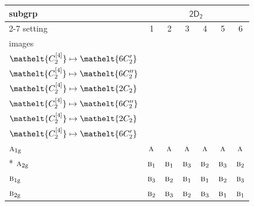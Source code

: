 \documentclass[10pt,a4paper]{article}
\numberwithin{equation}{section}
\newcommand{\eltfont}[1]{{\let\sigma\eltsigma\mathelt{#1}}}
\newcommand{\grp}[1]{\mathsf{#1}}
\newcommand{\irr}[1]{\text{\normalfont\scshape #1}}
\newcommand{\cls}[1]{\eltfont{#1}}
\newcommand{\ptag}[1]{\mathrm{#1}}
\newcommand{\genidx}[2]{#1^{[\mathrm{#2}]}}
\begin{document}
{\small\begin{longtable}{@{}lcccccc@{}}\toprule
subgrp & \multicolumn{6}{c}{\href{2D2.pdf}{$\grp{2D_{2}}$}}\\\cmidrule(lr){2-7}
setting & 1 & 2 & 3 & 4 & 5 & 6\\
images & {\scriptsize\begin{tabular}[t]{@{}c@{}}$\cls{\genidx{C_{2}}{2}} \mapsto \cls{2C_{2}}$\\$\cls{\genidx{C_{2}}{4}} \mapsto \cls{6C_{2}'}$\end{tabular}} & {\scriptsize\begin{tabular}[t]{@{}c@{}}$\cls{\genidx{C_{2}}{2}} \mapsto \cls{2C_{2}}$\\$\cls{\genidx{C_{2}}{4}} \mapsto \cls{6C_{2}''}$\end{tabular}} & {\scriptsize\begin{tabular}[t]{@{}c@{}}$\cls{\genidx{C_{2}}{2}} \mapsto \cls{6C_{2}'}$\\$\cls{\genidx{C_{2}}{4}} \mapsto \cls{2C_{2}}$\end{tabular}} & {\scriptsize\begin{tabular}[t]{@{}c@{}}$\cls{\genidx{C_{2}}{2}} \mapsto \cls{6C_{2}'}$\\$\cls{\genidx{C_{2}}{4}} \mapsto \cls{6C_{2}''}$\end{tabular}} & {\scriptsize\begin{tabular}[t]{@{}c@{}}$\cls{\genidx{C_{2}}{2}} \mapsto \cls{6C_{2}''}$\\$\cls{\genidx{C_{2}}{4}} \mapsto \cls{2C_{2}}$\end{tabular}} & {\scriptsize\begin{tabular}[t]{@{}c@{}}$\cls{\genidx{C_{2}}{2}} \mapsto \cls{6C_{2}''}$\\$\cls{\genidx{C_{2}}{4}} \mapsto \cls{6C_{2}'}$\end{tabular}}\\\midrule\endhead
\bottomrule\endfoot\endlastfoot
$\irr{a}_{1\ptag{g}}$ & $\irr{a}$ & $\irr{a}$ & $\irr{a}$ & $\irr{a}$ & $\irr{a}$ & $\irr{a}$\\*
$\irr{a}_{2\ptag{g}}$ & $\irr{b}_{1}$ & $\irr{b}_{1}$ & $\irr{b}_{3}$ & $\irr{b}_{2}$ & $\irr{b}_{3}$ & $\irr{b}_{2}$\\
$\irr{b}_{1\ptag{g}}$ & $\irr{b}_{3}$ & $\irr{b}_{2}$ & $\irr{b}_{1}$ & $\irr{b}_{1}$ & $\irr{b}_{2}$ & $\irr{b}_{3}$\\
$\irr{b}_{2\ptag{g}}$ & $\irr{b}_{2}$ & $\irr{b}_{3}$ & $\irr{b}_{2}$ & $\irr{b}_{3}$ & $\irr{b}_{1}$ & $\irr{b}_{1}$\\

\end{longtable}}
\end{document}
